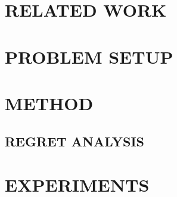 \documentclass[]{article}
\begin{document}
\section{RELATED WORK}
\label{sec:related_work}


\section{PROBLEM SETUP}
\label{sec:problem_setup}

\section{METHOD}
\label{sec:method}



\subsection{REGRET ANALYSIS}
\label{sec:regret}

\section{EXPERIMENTS}
\label{sec:exp}

\end{document}
